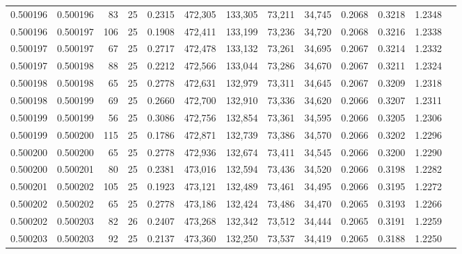 \begin{tabular}{rrrrrrrrrrrrr}
0.500196 & 0.500196 &  83 &  25 &                                     0.2315 & 472,305 & 133,305 &  73,211 &  34,745 & 0.2068 & 0.3218 & 1.2348 \\
0.500196 & 0.500197 & 106 &  25 &                                     0.1908 & 472,411 & 133,199 &  73,236 &  34,720 & 0.2068 & 0.3216 & 1.2338 \\
0.500197 & 0.500197 &  67 &  25 &                                     0.2717 & 472,478 & 133,132 &  73,261 &  34,695 & 0.2067 & 0.3214 & 1.2332 \\
0.500197 & 0.500198 &  88 &  25 &                                     0.2212 & 472,566 & 133,044 &  73,286 &  34,670 & 0.2067 & 0.3211 & 1.2324 \\
0.500198 & 0.500198 &  65 &  25 &                                     0.2778 & 472,631 & 132,979 &  73,311 &  34,645 & 0.2067 & 0.3209 & 1.2318 \\
0.500198 & 0.500199 &  69 &  25 &                                     0.2660 & 472,700 & 132,910 &  73,336 &  34,620 & 0.2066 & 0.3207 & 1.2311 \\
0.500199 & 0.500199 &  56 &  25 &                                     0.3086 & 472,756 & 132,854 &  73,361 &  34,595 & 0.2066 & 0.3205 & 1.2306 \\
0.500199 & 0.500200 & 115 &  25 &                                     0.1786 & 472,871 & 132,739 &  73,386 &  34,570 & 0.2066 & 0.3202 & 1.2296 \\
0.500200 & 0.500200 &  65 &  25 &                                     0.2778 & 472,936 & 132,674 &  73,411 &  34,545 & 0.2066 & 0.3200 & 1.2290 \\
0.500200 & 0.500201 &  80 &  25 &                                     0.2381 & 473,016 & 132,594 &  73,436 &  34,520 & 0.2066 & 0.3198 & 1.2282 \\
0.500201 & 0.500202 & 105 &  25 &                                     0.1923 & 473,121 & 132,489 &  73,461 &  34,495 & 0.2066 & 0.3195 & 1.2272 \\
0.500202 & 0.500202 &  65 &  25 &                                     0.2778 & 473,186 & 132,424 &  73,486 &  34,470 & 0.2065 & 0.3193 & 1.2266 \\
0.500202 & 0.500203 &  82 &  26 &                                     0.2407 & 473,268 & 132,342 &  73,512 &  34,444 & 0.2065 & 0.3191 & 1.2259 \\
0.500203 & 0.500203 &  92 &  25 &                                     0.2137 & 473,360 & 132,250 &  73,537 &  34,419 & 0.2065 & 0.3188 & 1.2250 \\

\end{tabular}
